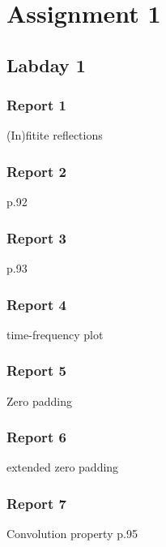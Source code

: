 \documentclass[11pt,titlepage]{report}
\begin{document}
\chapter{Assignment 1}
\section{Labday 1}
\subsection{Report 1}
(In)fitite reflections

\subsection{Report 2}
p.92
\subsection{Report 3}
p.93
\subsection{Report 4}
time-frequency plot
\subsection{Report 5}
Zero padding
\subsection{Report 6}
extended zero padding
\subsection{Report 7}
Convolution property p.95
\end{document}
